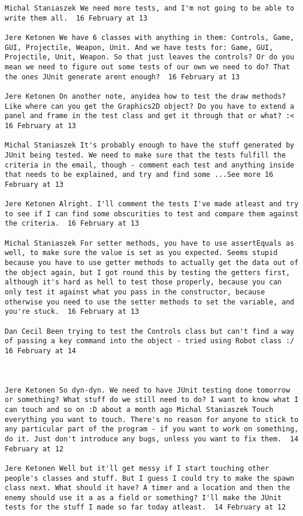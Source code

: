 \begin{verbatim}
Michal Staniaszek We need more tests, and I'm not going to be able to
write them all.  16 February at 13

Jere Ketonen We have 6 classes with anything in them: Controls, Game,
GUI, Projectile, Weapon, Unit. And we have tests for: Game, GUI,
Projectile, Unit, Weapon. So that just leaves the controls? Or do you
mean we need to figure out some tests of our own we need to do? That
the ones JUnit generate arent enough?  16 February at 13

Jere Ketonen On another note, anyidea how to test the draw methods?
Like where can you get the Graphics2D object? Do you have to extend a
panel and frame in the test class and get it through that or what? :<
16 February at 13

Michal Staniaszek It's probably enough to have the stuff generated by
JUnit being tested. We need to make sure that the tests fulfill the
criteria in the email, though - comment each test and anything inside
that needs to be explained, and try and find some ...See more 16
February at 13

Jere Ketonen Alright. I'll comment the tests I've made atleast and try
to see if I can find some obscurities to test and compare them against
the criteria.  16 February at 13

Michal Staniaszek For setter methods, you have to use assertEquals as
well, to make sure the value is set as you expected. Seems stupid
because you have to use getter methods to actually get the data out of
the object again, but I got round this by testing the getters first,
although it's hard as hell to test those properly, because you can
only test it against what you pass in the constructor, because
otherwise you need to use the setter methods to set the variable, and
you're stuck.  16 February at 13

Dan Cecil Been trying to test the Controls class but can't find a way
of passing a key command into the object - tried using Robot class :/
16 February at 14



Jere Ketonen So dyn-dyn. We need to have JUnit testing done tomorrow
or something? What stuff do we still need to do? I want to know what I
can touch and so on :D about a month ago Michal Staniaszek Touch
everything you want to touch. There's no reason for anyone to stick to
any particular part of the program - if you want to work on something,
do it. Just don't introduce any bugs, unless you want to fix them.  14
February at 12

Jere Ketonen Well but it'll get messy if I start touching other
people's classes and stuff. But I guess I could try to make the spawn
class next. What should it have? A timer and a location and then the
enemy should use it a as a field or something? I'll make the JUnit
tests for the stuff I made so far today atleast.  14 February at 12


\end{verbatim}
